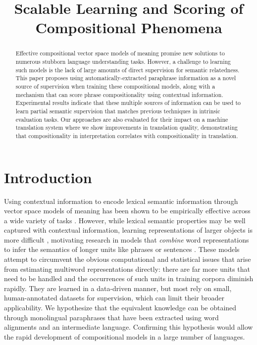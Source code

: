 \documentclass[11pt,letterpaper]{article}
\title{Scalable Learning and Scoring of Compositional Phenomena}
\date{}
\begin{document}
\maketitle
\begin{abstract}
Effective compositional vector space models of meaning promise new solutions to numerous stubborn language understanding tasks. However, a challenge to learning such models is the lack of large amounts of direct supervision for semantic relatedness. 
This paper proposes using automatically-extracted paraphrase information as a novel source of supervision when training these compositional models, along with a mechanism that can score phrase compositionality using contextual information. 
	Experimental results indicate that these multiple sources of information can be used to learn partial semantic supervision that matches previous techniques in intrinsic evaluation tasks. 
	Our approaches are also evaluated for their impact on a machine translation system where we show improvements in translation quality, demonstrating that compositionality in interpretation correlates with compositionality in translation. 
 \end{abstract}

\section{Introduction}

Using contextual information to encode lexical semantic information through vector space models of meaning has been shown to be empirically effective across a wide variety of tasks \cite{Turian2010,Turney2010,Mikolov2013b}.
However, while lexical semantic properties may be well captured with contextual information, learning representations of larger objects is more difficult \cite[\emph{inter alia}]{Sahlgren2006,Collobert2011}, motivating research in models that \emph{combine} word representations to infer the semantics of longer units like phrases or sentences \cite{Mitchell2010,Baroni2010,Socher2013}.
These models attempt to circumvent the obvious computational and statistical issues that arise from estimating multiword representations directly: there are far more units that need to be handled and the occurrences of such units in training corpora diminish rapidly.  
They are learned in a data-driven manner, but most rely on small, human-annotated datasets for supervision, which can limit their broader applicability.
We hypothesize that the equivalent knowledge can be obtained through monolingual paraphrases that have been extracted using word alignments and an intermediate language. 
Confirming this hypothesis would allow the rapid development of compositional models in a large number of languages. 
\end{document}
